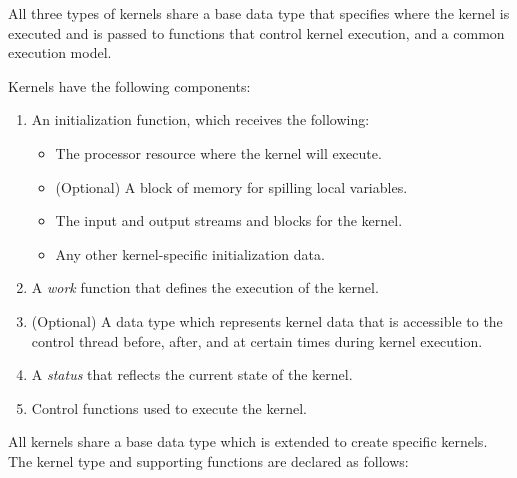 All three types of kernels share a base data type that 
specifies where the kernel is executed and is passed to functions that control kernel execution, and a common execution model.

Kernels have the following components:

\begin{enumerate}

\item An initialization function, which receives the following: 
\begin{itemize}
\item The processor resource where the kernel will execute. 
\item (Optional) A block of memory for spilling local variables. 
\item The input and output streams and blocks for the kernel. 
\item Any other kernel-specific initialization data. 
\end{itemize}

\item A {\it work} function that defines the execution of the kernel.

\item (Optional) A data type which represents kernel data that is accessible to the control thread before, after, and at certain times during kernel execution.

\item A {\it status} that reflects the current state of the kernel.

\item Control functions used to execute the kernel.

\end{enumerate}


All kernels share a base data type which is extended to 
create specific kernels. The kernel type and 
supporting functions are declared as follows:

